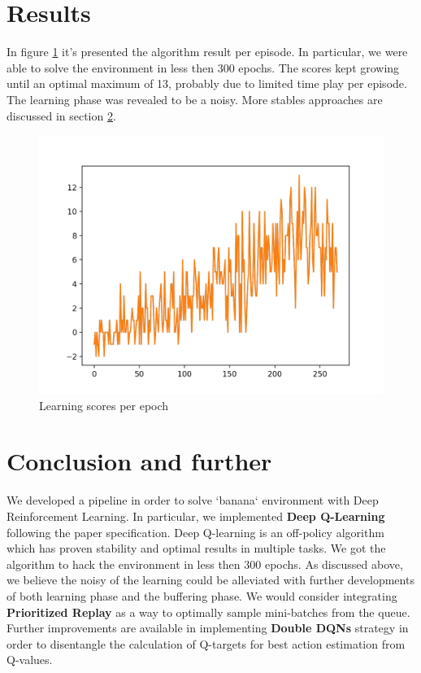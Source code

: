 \documentclass[11pt]{article}
\begin{document}
\section{Results}
\label{sec:org551cb12}
In figure \ref{fig:orgf52b795} it's presented the algorithm result per episode. In
particular, we were able to solve the environment in less then 300 epochs. The
scores kept growing until an optimal maximum of 13, probably due to limited time
play per episode. The learning phase was revealed to be a noisy. More stables
approaches are discussed in section \ref{sec:org5f8d235}. 

\begin{figure}[htbp]
\centering
\includegraphics[width=.9\linewidth]{./contents/agent.png}
\caption{\label{fig:orgf52b795}Learning scores per epoch}
\end{figure}

\section{Conclusion and further}
\label{sec:org5f8d235}
We developed a pipeline in order to solve `banana` environment with Deep
Reinforcement Learning. In particular, we implemented \textbf{Deep Q-Learning}
following the paper specification. Deep Q-learning is an off-policy algorithm
which has proven stability and optimal results in multiple tasks. We got the
algorithm to hack the environment in less then 300 epochs. As discussed above,
we believe the noisy of the learning could be alleviated with further
developments of both learning phase and the buffering phase. We would consider
integrating \textbf{Prioritized Replay} as a way to optimally sample mini-batches from
the queue. Further improvements are available in implementing \textbf{Double DQNs}
strategy in order to disentangle the calculation of Q-targets for best action
estimation from Q-values.
\end{document}
